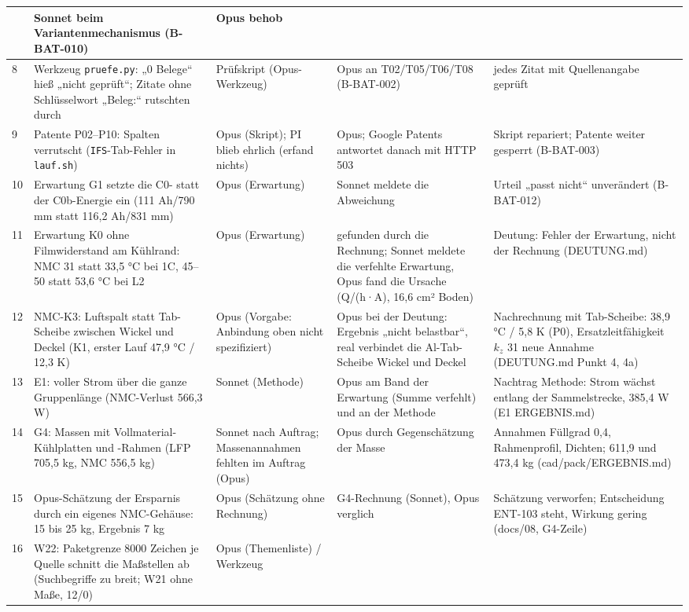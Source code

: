 \documentclass[10pt,a4paper]{article}
\begin{document}
\begin{longtable}{@{}p{0.4cm}p{3.6cm}p{2.5cm}p{4.4cm}p{3.0cm}@{}}
 & Sonnet beim Variantenmechanismus (B-BAT-010) & Opus behob\\\midrule
8 & Werkzeug \texttt{pruefe.py}: „0 Belege“ hieß „nicht geprüft“; Zitate ohne Schlüsselwort „Beleg:“ rutschten durch & Prüfskript (Opus-Werkzeug)
 & Opus an T02/T05/T06/T08 (B-BAT-002) & jedes Zitat mit Quellenangabe geprüft\\
9 & Patente P02–P10: Spalten verrutscht (\texttt{IFS}-Tab-Fehler in \texttt{lauf.sh}) & Opus (Skript); PI blieb ehrlich (erfand nichts)
 & Opus; Google Patents antwortet danach mit HTTP 503 & Skript repariert; Patente weiter gesperrt (B-BAT-003)\\
10 & Erwartung G1 setzte die C0- statt der C0b-Energie ein (111 Ah/790 mm statt 116,2 Ah/831 mm) & Opus (Erwartung)
 & Sonnet meldete die Abweichung & Urteil „passt nicht“ unverändert (B-BAT-012)\\
11 & Erwartung K0 ohne Filmwiderstand am Kühlrand: NMC 31 statt 33,5 °C bei 1C, 45--50 statt 53,6 °C bei L2 & Opus (Erwartung)
 & gefunden durch die Rechnung; Sonnet meldete die verfehlte Erwartung, Opus fand die Ursache (Q/(h·A), 16,6 cm² Boden) & Deutung: Fehler der Erwartung, nicht der Rechnung (DEUTUNG.md)\\\midrule
12 & NMC-K3: Luftspalt statt Tab-Scheibe zwischen Wickel und Deckel (K1, erster Lauf 47,9 °C / 12,3 K) & Opus (Vorgabe: Anbindung oben nicht spezifiziert)
 & Opus bei der Deutung: Ergebnis „nicht belastbar“, real verbindet die Al-Tab-Scheibe Wickel und Deckel & Nachrechnung mit Tab-Scheibe: 38,9 °C / 5,8 K (P0), Ersatzleitfähigkeit $k_z$ 31 neue Annahme (DEUTUNG.md Punkt 4, 4a)\\
13 & E1: voller Strom über die ganze Gruppenlänge (NMC-Verlust 566,3 W) & Sonnet (Methode)
 & Opus am Band der Erwartung (Summe verfehlt) und an der Methode & Nachtrag Methode: Strom wächst entlang der Sammelstrecke, 385,4 W (E1 ERGEBNIS.md)\\
14 & G4: Massen mit Vollmaterial-Kühlplatten und -Rahmen (LFP 705,5 kg, NMC 556,5 kg) & Sonnet nach Auftrag; Massenannahmen fehlten im Auftrag (Opus)
 & Opus durch Gegenschätzung der Masse & Annahmen Füllgrad 0,4, Rahmenprofil, Dichten; 611,9 und 473,4 kg (cad/pack/ERGEBNIS.md)\\
15 & Opus-Schätzung der Ersparnis durch ein eigenes NMC-Gehäuse: 15 bis 25 kg, Ergebnis 7 kg & Opus (Schätzung ohne Rechnung)
 & G4-Rechnung (Sonnet), Opus verglich & Schätzung verworfen; Entscheidung ENT-103 steht, Wirkung gering (docs/08, G4-Zeile)\\
16 & W22: Paketgrenze 8000 Zeichen je Quelle schnitt die Maßstellen ab (Suchbegriffe zu breit; W21 ohne Maße, 12/0) & Opus (Themenliste) / Werkzeug

\end{longtable}
\end{document}
